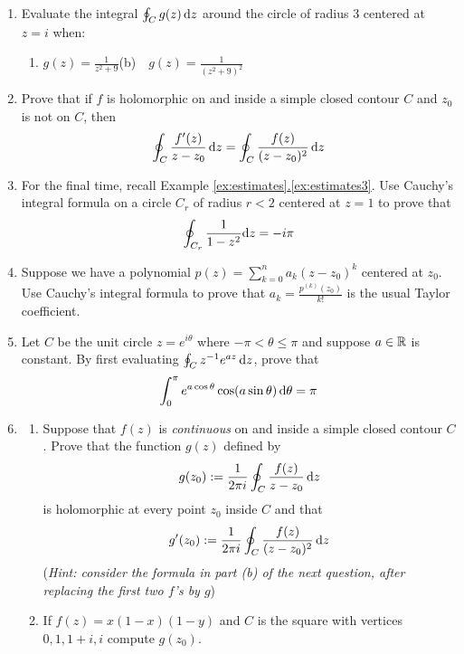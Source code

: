 \begin{exercises*}
\begin{enumerate}
  \item Evaluate the integral $\oint_C g(z)\,{\mathrm{d} z}$ around the circle of radius 3 centered at $z=i$ when:
  \begin{enumerate}
    \item $\displaystyle g(z)=\frac 1{z^2+9}$\qquad (b)\ \ $\displaystyle g(z)=\frac 1{(z^2+9)^2}$
  \end{enumerate} 
  
  \item Prove that if $f$ is holomorphic on and inside a simple closed contour $C$ and $z_0$ is not on $C$, then
  \[\oint_C\frac{f'(z)}{z-z_0}\,{\mathrm{d} z} =\oint_C\frac{f(z)}{(z-z_0)^2}\,{\mathrm{d} z}\]
  
  \item For the final time, recall Example \hyperref[ex:estimates3]{\ref*{ex:estimates}.\ref*{ex:estimates3}}. Use Cauchy's integral formula on a circle $C_r$ of radius $r<2$ centered at $z=1$ to prove that
  \[\oint_{C_r}\frac{1}{1-z^2}{\mathrm{d} z}=-i\pi\]
  
  \item Suppose we have a polynomial $p(z)=\sum\limits_{k=0}^na_k(z-z_0)^k$ centered at $z_0$.
  Use Cauchy's integral formula to prove that $a_k=\frac{p^{(k)}(z_0)}{k!}$ is the usual Taylor coefficient.
  
  \item Let $C$ be the unit circle $z=e^{i\theta}$ where $-\pi<\theta\le\pi$ and suppose $a\in\mathbb{R}$ is constant. By first evaluating $\oint_Cz^{-1}e^{az}\,{\mathrm{d} z}$, prove that
  \[\int_0^\pi e^{a\cos\theta}\cos(a\sin\theta)\,{\mathrm{d}\theta}=\pi\] 
	
	  
  \item\begin{enumerate}
     \item Suppose that $f(z)$ is \emph{continuous} on and inside a simple closed contour $C$. Prove that the function $g(z)$ defined by
    \[g(z_0):=\frac 1{2\pi i}\oint_C\frac{f(z)}{z-z_0}\,{\mathrm{d} z}\]
    is holomorphic at every point $z_0$ inside $C$ and that
    \[g'(z_0):=\frac 1{2\pi i}\oint_C\frac{f(z)}{(z-z_0)^2}\,{\mathrm{d} z}\]
    (\emph{Hint: consider the formula in part (b) of the next question, after replacing the first two $f$'s by $g$})
    
    \item If $f(z)=x(1-x)(1-y)$ and $C$ is the square with vertices $0,1,1+i,i$ compute $g(z_0)$.
  \end{enumerate}


\end{enumerate}
\end{exercises*}
